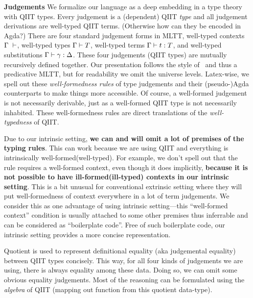 \textbf{Judgements}
We formalize our language as a deep embedding in a type theory with QIIT types. Every judgement is a (dependent) QIIT \textit{type} and all judgement derivations are well-typed QIIT terms. (Otherwise how can they be encoded in Agda?) There are four standard judgement forms in MLTT,
well-typed contexts $\goodCtx{\Gamma}{l}$, well-typed types
$\goodType{\Gamma}{T}{l}$, well-typed terms $\goodTerm{\Gamma}{t}{T}$, and
well-typed substitutions $\goodSub{\Gamma}{\gamma}{\Delta}$. These four judgements (QIIT types) are
mutually recursively defined together. Our presentation
follows the style of~\citet{kaposi2019gluing} and thus a predicative MLTT, but for readability we
omit the universe levels.
Latex-wise, we spell out these \textit{well-formedness rules} of type
judgements and their (pseudo-)Agda counterparts to make things more accessible. Of
course, a well-formed judgement is not necessarily derivable, just as
a well-formed QIIT type is not necessarily inhabited. These well-formedness rules are direct translations of the \textit{well-typedness} of QIIT. 


Due to our intrinsic setting, \textbf{we can and will omit a lot of premises of the typing rules}. This can work because we are using
QIIT and everything is intrinsically well-formed(well-typed). For example, we don't
spell out that the rule  requires a well-formed
context, even though it does implicitly, \textbf{because it is not
possible to have ill-formed(ill-typed) contexts in our intrinsic setting}. This is
a bit unusual for conventional extrinsic setting where they will put
well-formedness of context everywhere in a lot of term judgements. We
consider this as one advantage of using intrinsic setting---this
``well-formed context'' condition is usually attached to some other premises thus
inferrable and can be considered as ``boilerplate code''. Free of
such boilerplate code, our intrinsic setting provides a more concise
representation.

Quotient is used to represent definitional equality (aka judgemental
equality) between QIIT types concisely.
This way, for all four kinds of judgements we are
using, there is always equality among these data. Doing so, we can omit
some obvious equality judgements. Most of the reasoning can be formulated
using the \textit{algebra} of QIIT (mapping out function from this
quotient data-type). 


